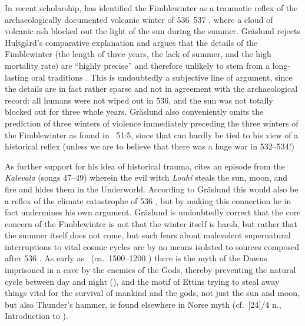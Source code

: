 {{In recent scholarship, \textcite{Gräslund2008} has identified the Fimblewinter as a traumatic reflex of the archaeologically documented volcanic winter of 536--537 \ce, where a cloud of volcanic ash blocked out the light of the sun during the summer.  Gräslund rejects Hultgård’s comparative explanation and argues that the details of the Fimblewinter (the length of three years, the lack of summer, and the high mortality rate) are “highly precise” and therefore unlikely to stem from a long-lasting oral traditions \parencite[94--95]{Gräslund2008}.  This is undoubtedly a subjective line of argument, since the details are in fact rather sparse and not in agreement with the archaeological record: all humans were not wiped out in 536, and the sun was not totally blocked out for three whole years.  Gräslund also conveniently omits the prediction of three winters of violence immediately preceding the three winters of the Fimblewinter as found in \Gylfaginning~51:5, since that can hardly be tied to his view of a historical reflex (unless we are to believe that there was a huge war in 532--534!)

As further support for his idea of historical trauma, \textcite[99--101]{Gräslund2008} cites an episode from the \emph{Kalevala} (songs 47--49) wherein the evil witch \emph{Louhi} steals the sun, moon, and fire and hides them in the Underworld.  According to Gräslund this would also be a reflex of the climate catastrophe of 536 \ce, but by making this connection he in fact undermines his own argument.  Gräslund is undoubtedly correct that the core concern of the Fimblewinter is not that the winter itself is harsh, but rather that the summer itself does not come, but such fears about malevolent supernatural interruptions to vital cosmic cycles are by no means isolated to sources composed after 536 \ce.
As early as \Rigveda\ (ca.~1500--1200 \bce) there is the myth of the Dawns imprisoned in a cave by the enemies of the Gods, thereby preventing the natural cycle between day and night (\cite[70--71]{JamBrer2020}), and the motif of Ettins trying to steal away things vital for the survival of mankind and the gods, not just the sun and moon, but also Thunder’s hammer, is found elsewhere in Norse myth (cf.~[24]/4 n., Introduction to ).

}}
